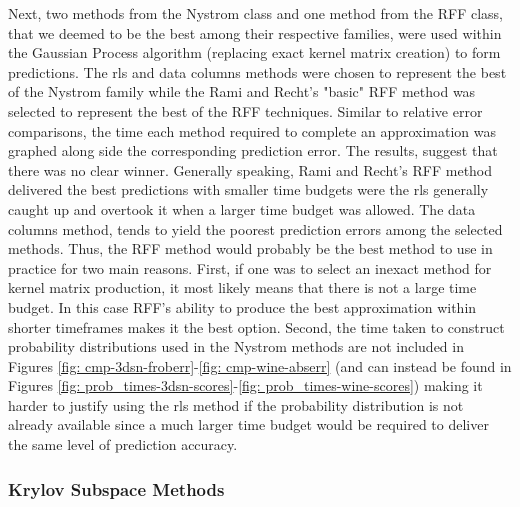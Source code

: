 Next, two methods from the Nystrom class and one method from the RFF class, that we deemed to be the best among their respective families, were used within the Gaussian Process algorithm (replacing exact kernel matrix creation) to form predictions. The rls and data columns methods were chosen to represent the best of the Nystrom family while the Rami and Recht's "basic" RFF method was selected to represent the best of the RFF techniques. Similar to relative error comparisons, the time each method required to complete an approximation was graphed along side the corresponding prediction error. The results, suggest that there was no clear winner. Generally speaking, Rami and Recht's RFF method delivered the best predictions with smaller time budgets were the rls generally caught up and overtook it when a larger time budget was allowed. The data columns method, tends to yield the poorest prediction errors among the selected methods. Thus, the RFF method would probably be the best method to use in practice for two main reasons. First, if one was to select an inexact method for kernel matrix production, it most likely means that there is not a large time budget. In this case RFF's ability to produce the best approximation within shorter timeframes makes it the best option. Second, the time taken to construct probability distributions used in the Nystrom methods are not included in Figures \ref{fig: cmp-3dsn-froberr}-\ref{fig: cmp-wine-abserr} (and can instead be found in Figures \ref{fig: prob_times-3dsn-scores}-\ref{fig: prob_times-wine-scores}) making it harder to justify using the rls method if the probability distribution is not already available since a much larger time budget would be required to deliver the same level of prediction accuracy.

\subsubsection{Krylov Subspace Methods}\label{Section5.3.2}

